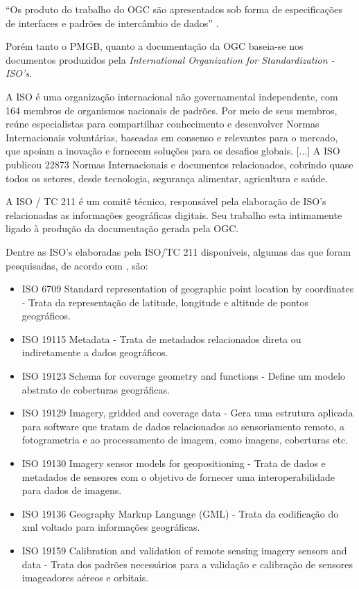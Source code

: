 ``Os produto do trabalho do OGC são apresentados sob forma de especificações de interfaces e padrões de intercâmbio de dados'' \cite[p.66]{queiroz2006tutorial}.

Porém tanto o PMGB, quanto a documentação da OGC baseia-se nos documentos produzidos pela \textit{International Organization for Standardization - ISO's}.

\begin{citacao}
    A ISO é uma organização internacional não governamental independente, com 164 membros de organismos nacionais de padrões. Por meio de seus membros, reúne especialistas para compartilhar conhecimento e desenvolver Normas Internacionais voluntárias, baseadas em consenso e relevantes para o mercado, que apoiam a inovação e fornecem soluções para os desafios globais. [...] A ISO publicou 22873 Normas Internacionais e documentos relacionados, cobrindo quase todos os setores, desde tecnologia, segurança alimentar, agricultura e saúde.\cite[p.1]{iso}
\end{citacao}


A ISO / TC 211 é um comitê técnico, responsável pela elaboração de ISO's relacionadas as informações geográficas digitais. Seu trabalho esta intimamente ligado à produção da documentação gerada pela OGC.

Dentre as ISO's elaboradas pela ISO/TC 211  disponíveis, algumas das que foram pesquisadas, de acordo com , são:
\begin{itemize}
    \item ISO 6709 Standard representation of geographic point location by coordinates - Trata da representação de latitude, longitude e altitude de pontos geográficos.
    \item ISO 19115 Metadata - Trata de metadados relacionados direta ou indiretamente a dados geográficos.
    \item ISO 19123 Schema for coverage geometry and functions - Define um modelo abstrato de coberturas geográficas.
    \item ISO 19129 Imagery, gridded and coverage data - Gera uma estrutura aplicada para software que tratam de dados relacionados ao sensoriamento remoto, a fotogrametria e ao processamento de imagem, como imagens, coberturas etc.
    \item ISO 19130 Imagery sensor models for geopositioning - Trata de dados e metadados de sensores com o objetivo de fornecer uma interoperabilidade para dados de imagens.
    \item ISO 19136 Geography Markup Language (GML) - Trata da codificação do xml voltado para informações geográficas.
    \item ISO 19159 Calibration and validation of remote sensing imagery sensors and data - Trata dos padrões necessários para a validação e calibração de sensores imageadores aéreos e orbitais.
\end{itemize}

